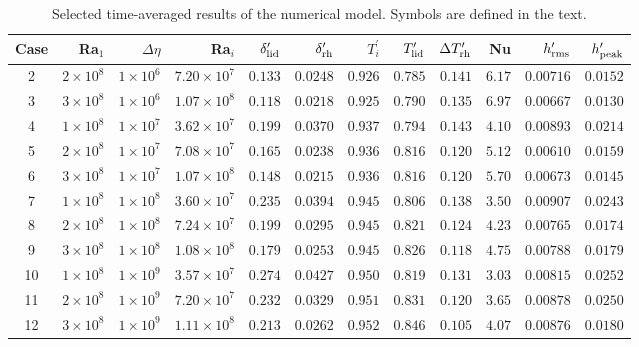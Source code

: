\documentclass[trackchanges]{aastex63}
\begin{document}
\begin{table}[h!]
\centering
\caption{Selected time-averaged results of the numerical model. Symbols are defined in the text. \label{tab:aspect-out}}
\footnotesize
\begin{tabular}{@{} c r r r r r r r r r r r @{}}
\toprule
Case & Ra$_1$ & $\Delta \eta$ & Ra$_i$ & $\delta_{\rm lid}^\prime$ & $\delta_{\rm rh}^\prime$ & $T_i^\prime$ & $T_{\rm lid}^\prime$ & $\Delta T_{\rm rh}^\prime$ & Nu & $h_{\rm rms}^\prime$ & $h_{\rm peak}^\prime$  \\
\midrule

2 & $2 \times 10^{8}$ & $1 \times 10^{6}$ & $7.20 \times 10^{7}$ & $0.133$ & $0.0248$ & $0.926$ & $0.785$ & $0.141$ & $6.17$ & $0.00716$ & $0.0152$ \\
3 & $3 \times 10^{8}$ & $1 \times 10^{6}$ & $1.07 \times 10^{8}$ & $0.118$ & $0.0218$ & $0.925$ & $0.790$ & $0.135$ & $6.97$ & $0.00667$ & $0.0130$ \\
4 & $1 \times 10^{8}$ & $1 \times 10^{7}$ & $3.62 \times 10^{7}$ & $0.199$ & $0.0370$ & $0.937$ & $0.794$ & $0.143$ & $4.10$ & $0.00893$ & $0.0214$ \\
5 & $2 \times 10^{8}$ & $1 \times 10^{7}$ & $7.08 \times 10^{7}$ & $0.165$ & $0.0238$ & $0.936$ & $0.816$ & $0.120$ & $5.12$ & $0.00610$ & $0.0159$ \\
6 & $3 \times 10^{8}$ & $1 \times 10^{7}$ & $1.07 \times 10^{8}$ & $0.148$ & $0.0215$ & $0.936$ & $0.816$ & $0.120$ & $5.70$ & $0.00673$ & $0.0145$ \\
7 & $1 \times 10^{8}$ & $1 \times 10^{8}$ & $3.60 \times 10^{7}$ & $0.235$ & $0.0394$ & $0.945$ & $0.806$ & $0.138$ & $3.50$ & $0.00907$ & $0.0243$ \\
8 & $2 \times 10^{8}$ & $1 \times 10^{8}$ & $7.24 \times 10^{7}$ & $0.199$ & $0.0295$ & $0.945$ & $0.821$ & $0.124$ & $4.23$ & $0.00765$ & $0.0174$ \\
9 & $3 \times 10^{8}$ & $1 \times 10^{8}$ & $1.08 \times 10^{8}$ & $0.179$ & $0.0253$ & $0.945$ & $0.826$ & $0.118$ & $4.75$ & $0.00788$ & $0.0179$ \\
10 & $1 \times 10^{8}$ & $1 \times 10^{9}$ & $3.57 \times 10^{7}$ & $0.274$ & $0.0427$ & $0.950$ & $0.819$ & $0.131$ & $3.03$ & $0.00815$ & $0.0252$ \\
11 & $2 \times 10^{8}$ & $1 \times 10^{9}$ & $7.20 \times 10^{7}$ & $0.232$ & $0.0329$ & $0.951$ & $0.831$ & $0.120$ & $3.65$ & $0.00878$ & $0.0250$ \\
12 & $3 \times 10^{8}$ & $1 \times 10^{9}$ & $1.11 \times 10^{8}$ & $0.213$ & $0.0262$ & $0.952$ & $0.846$ & $0.105$ & $4.07$ & $0.00876$ & $0.0180$ \\






\bottomrule
\end{tabular}
\end{table}



\end{document}

